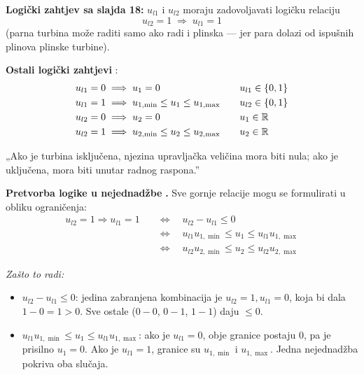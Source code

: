 \textbf{Logički zahtjev sa slajda 18:} $u_{l1}$ i $u_{l2}$ moraju zadovoljavati
logičku relaciju
\[
u_{l2} = 1 \;\Longrightarrow\; u_{l1} = 1
\]
(parna turbina može raditi samo ako radi i plinska --- jer para dolazi od
ispušnih plinova plinske turbine).

\textbf{Ostali logički zahtjevi} :
\[
\begin{aligned}
u_{l1} = 0 &\;\Longrightarrow\; u_1 = 0 \\
u_{l1} = 1 &\;\Longrightarrow\; u_{1,\min} \le u_1 \le u_{1,\max} \\
u_{l2} = 0 &\;\Longrightarrow\; u_2 = 0 \\
u_{l2} = 1 &\;\Longrightarrow\; u_{2,\min} \le u_2 \le u_{2,\max}
\end{aligned}
\qquad
\begin{aligned}
&u_{l1} \in \{0,1\} \\
&u_{l2} \in \{0,1\} \\
&u_1 \in \mathbb{R} \\
&u_2 \in \mathbb{R}
\end{aligned}
\]

„Ako je turbina isključena, njezina upravljačka veličina mora biti nula; ako je
uključena, mora biti unutar radnog raspona.”

\textbf{Pretvorba logike u nejednadžbe} \textbf{.} Sve gornje relacije
mogu se formulirati u obliku ograničenja:
\[
\begin{aligned}
u_{l2} = 1 \Rightarrow u_{l1} = 1 \quad&\Longleftrightarrow\quad
u_{l2} - u_{l1} \le 0 \\
&\Longleftrightarrow\quad u_{l1}u_{1,\min} \le u_1 \le u_{l1}u_{1,\max} \\
&\Longleftrightarrow\quad u_{l2}u_{2,\min} \le u_2 \le u_{l2}u_{2,\max}
\end{aligned}
\]

\emph{Zašto to radi:}
\begin{itemize}
  \item $u_{l2} - u_{l1} \le 0$: jedina zabranjena kombinacija je
        $u_{l2}=1, u_{l1}=0$, koja bi dala $1 - 0 = 1 > 0$. Sve ostale
        ($0{-}0$, $0{-}1$, $1{-}1$) daju $\le 0$. \checkmark
  \item $u_{l1}u_{1,\min} \le u_1 \le u_{l1}u_{1,\max}$: ako je $u_{l1} = 0$,
        obje granice postaju $0$, pa je prisilno $u_1 = 0$. Ako je
        $u_{l1} = 1$, granice su $u_{1,\min}$ i $u_{1,\max}$. Jedna nejednadžba
        pokriva oba slučaja. \checkmark
\end{itemize}

